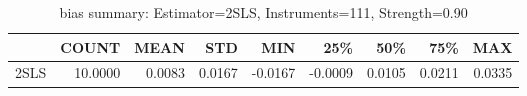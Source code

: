 \begin{table}[ht]
\centering
\caption{bias summary: Estimator=2SLS, Instruments=111, Strength=0.90}
\begin{tabular}{lrrrrrrrr}
\toprule
 & COUNT & MEAN & STD & MIN & 25\% & 50\% & 75\% & MAX \\
\midrule
2SLS & 10.0000 & 0.0083 & 0.0167 & -0.0167 & -0.0009 & 0.0105 & 0.0211 & 0.0335 \\
\bottomrule
\end{tabular}
\end{table}

